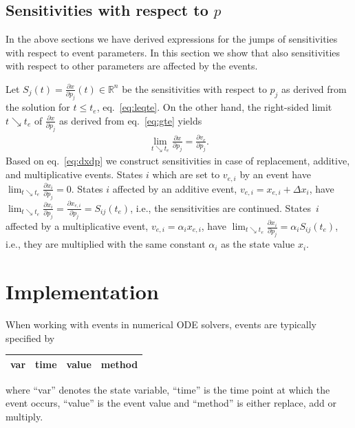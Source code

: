 \documentclass[journal, a4paper]{IEEEtran}
\begin{document}
\subsection{Sensitivities with respect to $p$}


In the above sections we have derived expressions for the jumps of sensitivities with respect to event parameters. In this section we show that also sensitivities with respect to other parameters are affected by the events.

Let 
$S_j(t) = \frac{\partial x}{\partial p_j}(t) \in \mathbb R^n$
be the sensitivities with respect to $p_j$ as derived from the solution for $t \leq t_e$, eq.~\eqref{eq:leqte}. On the other hand, the right-sided limit $t\searrow t_e$ of $\frac{\partial x}{\partial p_j}$ as derived from eq.~\eqref{eq:gte} yields 
\begin{align}
    \lim_{t\searrow t_e}\frac{\partial x}{\partial p_j} = \frac{\partial v_e}{\partial p_j}.
    \label{eq:dxdp}
\end{align}
Based on eq.~\eqref{eq:dxdp} we construct sensitivities in case of replacement, additive, and multiplicative events. States $i$ which are set to $v_{e, i}$ by an event have $\lim_{t\searrow t_e}\frac{\partial x_i}{\partial p_j} = 0$. States $i$ affected by an additive event, $v_{e, i} = x_{e, i} + \Delta x_i$, have $\lim_{t\searrow t_e}\frac{\partial x_i}{\partial p_j} = \frac{\partial x_{e, i}}{\partial p_j} = S_{ij}(t_e)$, i.e., the sensitivities are continued. States~$i$ affected by a multiplicative event, $v_{e, i} = \alpha_i x_{e, i}$, have $\lim_{t\searrow t_e}\frac{\partial x_i}{\partial p_j} = \alpha_i S_{ij}(t_e)$, i.e., they are multiplied with the same constant $\alpha_i$ as the state value $x_i$.


\section{Implementation}


When working with events in numerical ODE solvers, events are typically specified by 
\begin{center}
\begin{tabular}{|c|c|c|c|}\hline
     var & time & value & method \\
     \hline
\end{tabular}
\end{center}
where ``var'' denotes the state variable, ``time'' is the time point at which the event occurs, ``value'' is the event value and ``method'' is either replace, add or multiply.
	
\end{document}
